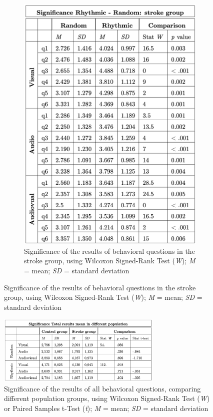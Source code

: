 \begin{figure}[H]
    \begin{subfigure}[b]{0.5\textwidth}
        \centering
        \includegraphics[width=\textwidth]{significance_tables/stroke_group.png}
        \caption{Significance of the results of behavioral questions in the stroke group, using Wilcoxon Signed-Rank Test (\textit{W}); \textit{M} = mean; \textit{SD} = standard deviation}
        \label{fig: significance_stroke_pop} 
    \end{subfigure}
\end{figure} 

\begin{figure}[H]
    \centering
    \includegraphics[width=0.70\textwidth]{significance_tables/tot_mean_pop.png}
    \caption{Significance of the results of all behavioral questions, comparing different population groups, using Wilcoxon Signed-Rank Test (\textit{W}) or Paired Samples t-Test (\textit{t}); \textit{M} = mean; \textit{SD} = standard deviation}
    \label{fig: significance_total_mean_pop} 
\end{figure} 

